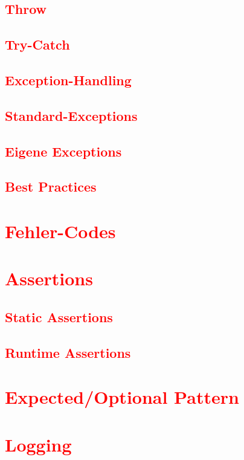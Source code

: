 \subsection{\textcolor{red}{Throw}}\label{sec:throw}
\subsection{\textcolor{red}{Try-Catch}}\label{sec:catch}
\subsection{\textcolor{red}{Exception-Handling}}\label{sec:exception-handling}
\subsection{\textcolor{red}{Standard-Exceptions}}\label{sec:standard-exceptions}
\subsection{\textcolor{red}{Eigene Exceptions}}\label{sec:custom-exceptions}
\subsection{\textcolor{red}{Best Practices}}\label{sec:best-practices}
\section{\textcolor{red}{Fehler-Codes}}\label{sec:error-codes}
\section{\textcolor{red}{Assertions}}\label{sec:assertions}
\subsection{\textcolor{red}{Static Assertions}}\label{sec:static-assertions}
\subsection{\textcolor{red}{Runtime Assertions}}\label{sec:runtime-assertions}
\section{\textcolor{red}{Expected/Optional Pattern}}\label{sec:expected-optional}
\section{\textcolor{red}{Logging}}\label{sec:logging}

